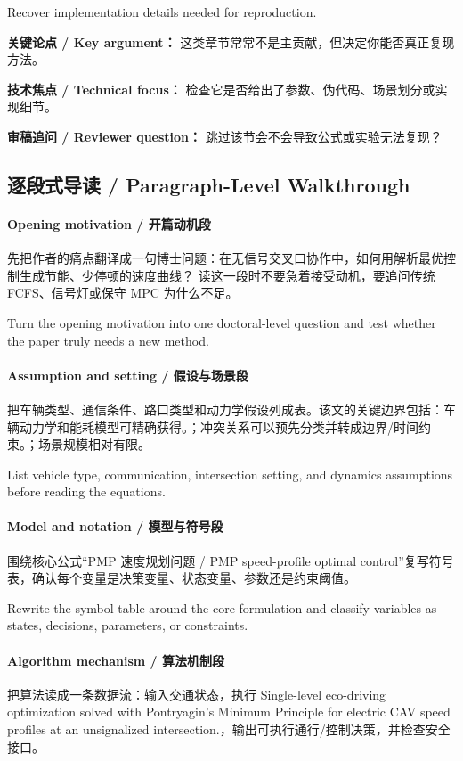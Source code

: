 \documentclass[UTF8,a4paper,11pt,fontset=fandol]{ctexart}
\begin{document}
Recover implementation details needed for reproduction.

\textbf{关键论点 / Key argument：} 这类章节常常不是主贡献，但决定你能否真正复现方法。

\textbf{技术焦点 / Technical focus：} 检查它是否给出了参数、伪代码、场景划分或实现细节。

\textbf{审稿追问 / Reviewer question：} 跳过该节会不会导致公式或实验无法复现？


\subsection{逐段式导读 / Paragraph-Level Walkthrough}
\paragraph{Opening motivation / 开篇动机段}先把作者的痛点翻译成一句博士问题：在无信号交叉口协作中，如何用解析最优控制生成节能、少停顿的速度曲线？ 读这一段时不要急着接受动机，要追问传统 FCFS、信号灯或保守 MPC 为什么不足。

Turn the opening motivation into one doctoral-level question and test whether the paper truly needs a new method.

\paragraph{Assumption and setting / 假设与场景段}把车辆类型、通信条件、路口类型和动力学假设列成表。该文的关键边界包括：车辆动力学和能耗模型可精确获得。；冲突关系可以预先分类并转成边界/时间约束。；场景规模相对有限。

List vehicle type, communication, intersection setting, and dynamics assumptions before reading the equations.

\paragraph{Model and notation / 模型与符号段}围绕核心公式“PMP 速度规划问题 / PMP speed-profile optimal control”复写符号表，确认每个变量是决策变量、状态变量、参数还是约束阈值。

Rewrite the symbol table around the core formulation and classify variables as states, decisions, parameters, or constraints.

\paragraph{Algorithm mechanism / 算法机制段}把算法读成一条数据流：输入交通状态，执行 Single-level eco-driving optimization solved with Pontryagin's Minimum Principle for electric CAV speed profiles at an unsignalized intersection.，输出可执行通行/控制决策，并检查安全接口。
\end{document}
